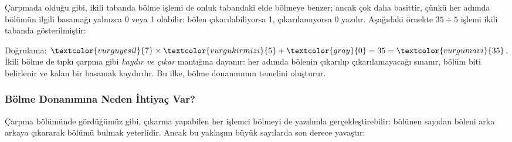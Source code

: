 Çarpmada olduğu gibi, ikili tabanda bölme işlemi de onluk tabandaki elde bölmeye benzer; ancak çok daha basittir, çünkü her adımda bölümün ilgili basamağı yalnızca 0 veya 1 olabilir: bölen çıkarılabiliyorsa 1, çıkarılamıyorsa 0 yazılır. Aşağıdaki örnekte $35 \div 5$ işlemi ikili tabanda gösterilmiştir:

\begin{center}
\end{center}

Doğrulama: $\textcolor{vurguyesil}{7} \times \textcolor{vurgukirmizi}{5} + \textcolor{gray}{0} = 35 = \textcolor{vurgumavi}{35}$\;\checkmark. İkili bölme de tıpkı çarpma gibi \emph{kaydır ve çıkar} mantığına dayanır: her adımda bölenin çıkarılıp çıkarılamayacağı sınanır, bölüm biti belirlenir ve kalan bir basamak kaydırılır. Bu ilke, bölme donanımının temelini oluşturur.

\subsubsection*{Bölme Donanımına Neden İhtiyaç Var?}

Çarpma bölümünde gördüğümüz gibi, çıkarma yapabilen her işlemci bölmeyi de yazılımla gerçekleştirebilir: bölünen sayıdan böleni arka arkaya çıkararak bölümü bulmak yeterlidir. Ancak bu yaklaşım büyük sayılarda son derece yavaştır:

